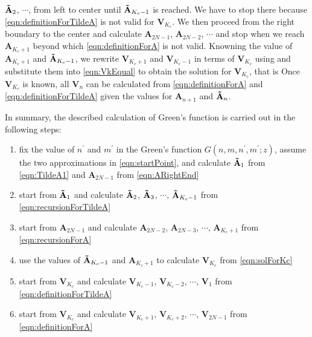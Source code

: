 $\mathbf{\Tilde{A}}_{2}$, $\cdots$, from left to
center until $\mathbf{\Tilde{A}}_{K_c - 1}$ is reached. We have to stop there because  
\autoref{eqn:definitionForTildeA} is not valid for  $\mathbf{V}_{K_c}$. 
We then proceed from the right boundary to the center and calculate $\mathbf{A}_{2N-1}$, 
$\mathbf{A}_{2N-2}$, $\cdots$ and stop when we reach $\mathbf{A}_{K_c + 1}$ beyond which
\autoref{eqn:definitionForA} is not valid. Knowning the value of $\mathbf{A}_{K_c + 1}$ and 
$\mathbf{\Tilde{A}}_{K_c - 1}$, we rewrite $\mathbf{V}_{K_c +1}$ and $\mathbf{V}_{K_c - 1}$ in terms of
 $\mathbf{V}_{K_c}$ using
and substitute them into \autoref{eqn:VkEqual} to obtain the solution for $\mathbf{V}_{K_c}$, that is
Once $\mathbf{V}_{K_c}$ is known, all $\mathbf{V}_{n}$ can be calculated from \autoref{eqn:definitionForA} and
\autoref{eqn:definitionForTildeA} given the values for $\mathbf{A}_{n+1}$ and $\mathbf{\Tilde{A}}_{n}$.

In summary, the described calculation of Green's function is carried out in the following steps: 
\begin{enumerate}
\item{fix the value of $n^{\prime}$ and $m^{\prime}$ in the Green's function $G(n, m, n^{\prime}, m^{\prime}; z)$, 
assume the two approximations in \autoref{eqn:startPoint}, and calculate $\mathbf{\Tilde{A}}_{1}$ from 
\autoref{eqn:TildeA1} and $\mathbf{A}_{2N-1}$ from \autoref{eqn:ARightEnd} }
\item{start from $\mathbf{\Tilde{A}}_{1}$ and calculate $\mathbf{\Tilde{A}}_{2}$, $\mathbf{\Tilde{A}}_{3}$, $\cdots$, 
$\mathbf{\Tilde{A}}_{K_c - 1}$ from \autoref{eqn:recursionForTildeA} }
\item{start from $\mathbf{A}_{2N-1}$ and calculate $\mathbf{A}_{2N-2}$, 
$\mathbf{A}_{2N-3}$, $\cdots$, $\mathbf{A}_{K_c + 1}$ from \autoref{eqn:recursionForA} }
\item{use the values of $\mathbf{\Tilde{A}}_{K_c - 1}$ and $\mathbf{A}_{K_c + 1}$ to calculate $\mathbf{V}_{K_c}$ 
from \autoref{eqn:solForKc} }
\item{start from $\mathbf{V}_{K_c}$ and calculate $\mathbf{V}_{K_c-1}$, $\mathbf{V}_{K_c-2}$, $\cdots$, 
$\mathbf{V}_{1}$ from \autoref{eqn:definitionForTildeA} }
\item{start from $\mathbf{V}_{K_c}$ and calculate $\mathbf{V}_{K_c+1}$, $\mathbf{V}_{K_c+2}$, $\cdots$, $\mathbf{V}_{2N-1}$ from \autoref{eqn:definitionForA} }
\end{enumerate}

